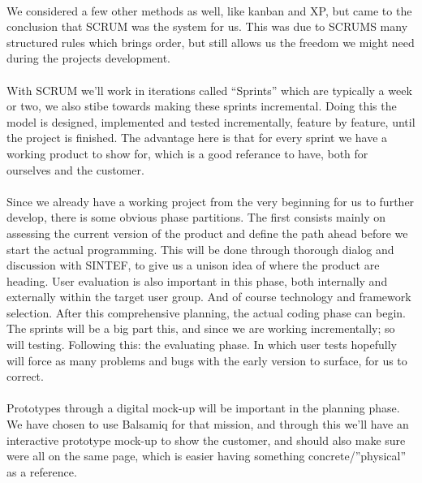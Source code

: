 \documentclass[12pt,a4paper,titlepage]{article}
\begin{document}
				\paragraph{}
We considered a few other methods as well, like kanban and XP, but came to the conclusion that SCRUM was the system for us. This was due to SCRUMS many structured rules which brings order, but still allows us the freedom we might need during the projects development.
				\paragraph{}
With SCRUM we’ll work in iterations called “Sprints” which are typically a week or two, we also stibe towards making these sprints incremental. Doing this the model is designed, implemented and tested incrementally, feature by feature, until the project is finished. The advantage here is that for every sprint we have a working product to show for, which is a good referance to have, both for ourselves and the customer. 
				\paragraph{}
Since we already have a working project from the very beginning for us to further develop, there is some obvious phase partitions. The first consists mainly on assessing the current version of the product and define the path ahead before we start the actual programming. This will be done through thorough dialog and discussion with SINTEF, to give us a unison idea of where the product are heading. User evaluation is also important in this phase, both internally and externally within the target user group. And of course technology and framework selection. After this comprehensive planning, the actual coding phase can begin. The sprints will be a big part this, and since we are working incrementally; so will testing. Following this: the evaluating phase. In which user tests hopefully will force as many problems and bugs with the early version to surface, for us to correct.
				\paragraph{}
Prototypes through a digital mock-up will be important in the planning phase. We have chosen to use Balsamiq for that mission, and through this we’ll have an interactive prototype mock-up to show the customer, and should also make sure were all on the same page, which is easier having something concrete/”physical” as a reference.
\end{document}
